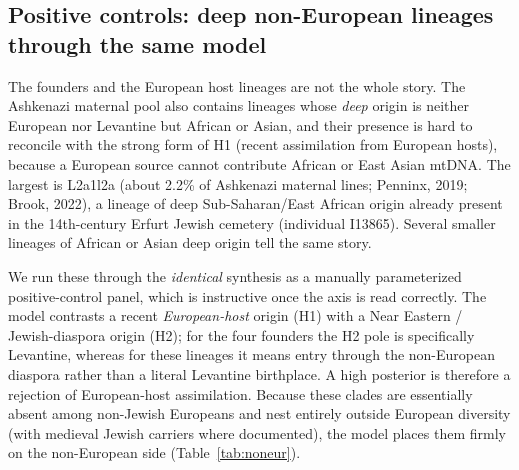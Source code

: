 \documentclass[11pt]{article}
\begin{document}
\subsection{Positive controls: deep non-European lineages through the same model}
The founders and the European host lineages are not the whole story. The Ashkenazi maternal pool also contains lineages whose \emph{deep} origin is neither European nor Levantine but African or Asian, and their presence is hard to reconcile with the strong form of H1 (recent assimilation from European hosts), because a European source cannot contribute African or East Asian mtDNA. The largest is L2a1l2a (about 2.2\% of Ashkenazi maternal lines; Penninx, 2019; Brook, 2022), a lineage of deep Sub-Saharan/East African origin already present in the 14th-century Erfurt Jewish cemetery (individual I13865). Several smaller lineages of African or Asian deep origin tell the same story.

We run these through the \emph{identical} synthesis as a manually parameterized positive-control panel, which is instructive once the axis is read correctly. The model contrasts a recent \emph{European-host} origin (H1) with a Near Eastern / Jewish-diaspora origin (H2); for the four founders the H2 pole is specifically Levantine, whereas for these lineages it means entry through the non-European diaspora rather than a literal Levantine birthplace. A high posterior is therefore a rejection of European-host assimilation. Because these clades are essentially absent among non-Jewish Europeans and nest entirely outside European diversity (with medieval Jewish carriers where documented), the model places them firmly on the non-European side (Table~\ref{tab:noneur}).
\end{document}
